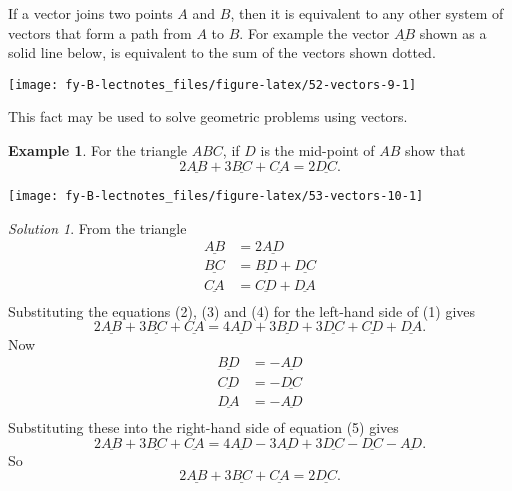 \documentclass[
  11pt,
  oneside]{book}
\newcommand{\slide}{}
\theoremstyle{definition}
\theoremstyle{definition}
\newtheorem{example}{Example}[chapter]
\theoremstyle{definition}
\theoremstyle{definition}
\theoremstyle{remark}
\newtheorem*{solution}{Solution}
\begin{document}
If a vector joins two points \(A\) and \(B\), then it is equivalent to any other system of vectors that form a path from \(A\) to \(B\). For example the vector \(\underline{AB}\) shown as a solid line below, is equivalent to the sum of the vectors shown dotted.

\begin{center}\texttt{[image: fy-B-lectnotes\_files/figure-latex/52-vectors-9-1]} \end{center}

This fact may be used to solve geometric problems using vectors.

\slide

\begin{example}

For the triangle \(ABC\), if \(D\) is the mid-point of \(AB\) show that
\[
2\underline{AB}+3\underline{BC}+\underline{CA} = 2\underline{DC}.\tag{1}
\]

\begin{center}\texttt{[image: fy-B-lectnotes\_files/figure-latex/53-vectors-10-1]} \end{center}

\end{example}

\begin{solution}
From the triangle
\begin{align*}
\underline{AB}&=2\underline{AD}\tag{2}\\
\underline{BC}&=\underline{BD}+\underline{DC}\tag{3}\\
\underline{CA}&=\underline{CD}+\underline{DA}\tag{4}\\
\end{align*}
Substituting the equations (2), (3) and (4) for the left-hand side of (1) gives
\[
2\underline{AB}+3\underline{BC}+\underline{CA}=4\underline{AD}+3\underline{BD}+3\underline{DC}+\underline{CD}+\underline{DA}.\tag{5}
\]
Now
\begin{align*}
\underline{BD}&=-\underline{AD}\tag{6}\\
\underline{CD}&=-\underline{DC}\tag{7}\\
\underline{DA}&=-\underline{AD}\tag{8}\\
\end{align*}
Substituting these into the right-hand side of equation (5) gives
\[
2\underline{AB}+3\underline{BC}+\underline{CA}=4\underline{AD}-3\underline{AD}+3\underline{DC}-\underline{DC}-\underline{AD}.
\]
So
\[
2\underline{AB}+3\underline{BC}+\underline{CA} = 2\underline{DC}.
\]
\end{solution}
\end{document}
